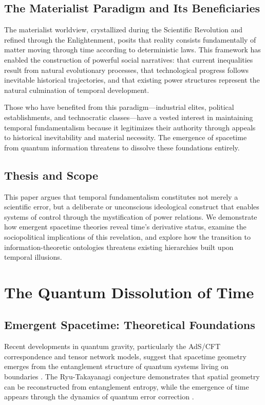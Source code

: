 \documentclass[12pt]{article}
\begin{document}
\subsection{The Materialist Paradigm and Its Beneficiaries}

The materialist worldview, crystallized during the Scientific Revolution and refined through the Enlightenment, posits that reality consists fundamentally of matter moving through time according to deterministic laws. This framework has enabled the construction of powerful social narratives: that current inequalities result from natural evolutionary processes, that technological progress follows inevitable historical trajectories, and that existing power structures represent the natural culmination of temporal development.

Those who have benefited from this paradigm—industrial elites, political establishments, and technocratic classes—have a vested interest in maintaining temporal fundamentalism because it legitimizes their authority through appeals to historical inevitability and material necessity. The emergence of spacetime from quantum information threatens to dissolve these foundations entirely.

\subsection{Thesis and Scope}

This paper argues that temporal fundamentalism constitutes not merely a scientific error, but a deliberate or unconscious ideological construct that enables systems of control through the mystification of power relations. We demonstrate how emergent spacetime theories reveal time's derivative status, examine the sociopolitical implications of this revelation, and explore how the transition to information-theoretic ontologies threatens existing hierarchies built upon temporal illusions.

\section{The Quantum Dissolution of Time}

\subsection{Emergent Spacetime: Theoretical Foundations}

Recent developments in quantum gravity, particularly the AdS/CFT correspondence and tensor network models, suggest that spacetime geometry emerges from the entanglement structure of quantum systems living on boundaries \cite{Ryu2006, VanRaamsdonk2010}. The Ryu-Takayanagi conjecture demonstrates that spatial geometry can be reconstructed from entanglement entropy, while the emergence of time appears through the dynamics of quantum error correction \cite{Almheiri2015}.
\end{document}
